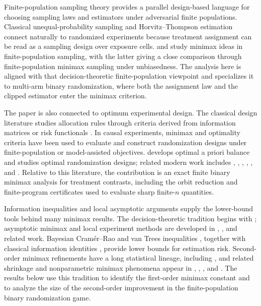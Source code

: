 \documentclass[11pt]{article}
\begin{document}
Finite-population sampling theory provides a parallel design-based language for choosing sampling laws and estimators under adversarial finite populations. Classical unequal-probability sampling and Horvitz--Thompson estimation \citep{horvitz_1952,hansen_1953,sarndal_1992} connect naturally to randomized experiments because treatment assignment can be read as a sampling design over exposure cells. \citet{gabler_1990} and \citet{aronow_lopatto_2026_minimax_unbiased} study minimax ideas in finite-population sampling, with the latter giving a close comparison through finite-population minimax sampling under unbiasedness. The analysis here is aligned with that decision-theoretic finite-population viewpoint and specializes it to multi-arm binary randomization, where both the assignment law and the clipped estimator enter the minimax criterion.

The paper is also connected to optimum experimental design. The classical design literature studies allocation rules through criteria derived from information matrices or risk functionals \citep{smith_1918,kiefer_1959,kiefer_1974,atkinson_2007}. In causal experiments, minimax and optimality criteria have been used to evaluate and construct randomization designs under finite-population or model-assisted objectives. \citet{kallus_2018} develops optimal a priori balance and \citet{kallus_2020_optimality} studies optimal randomization designs; related modern work includes \citet{basse_2023}, \citet{harshaw_2024}, \citet{kandiros_2024,kandiros_2026}, \citet{eckles_2014}, \citet{derezinski_2019}, and \citet{hu_2024}. Relative to this literature, the contribution is an exact finite binary minimax analysis for treatment contrasts, including the orbit reduction and finite-program certificates used to evaluate sharp finite-\(n\) quantities.

Information inequalities and local asymptotic arguments supply the lower-bound tools behind many minimax results. The decision-theoretic tradition begins with \citet{wald_1950}; asymptotic minimax and local experiment methods are developed in \citet{lecam_1986}, \citet{ibragimov_1981}, and related work. Bayesian Cramér--Rao and van Trees inequalities \citep{van_trees_1968,gill_1995}, together with classical information identities \citep{rao_1945}, provide lower bounds for estimation risk. Second-order minimax refinements have a long statistical lineage, including \citet{levit_1981_second_order}, and related shrinkage and nonparametric minimax phenomena appear in \citet{bickel_1981}, \citet{pinsker_1980}, \citet{feldman_1991}, and \citet{johnstone_1992}. The results below use this tradition to identify the first-order minimax constant and to analyze the size of the second-order improvement in the finite-population binary randomization game.
\end{document}
